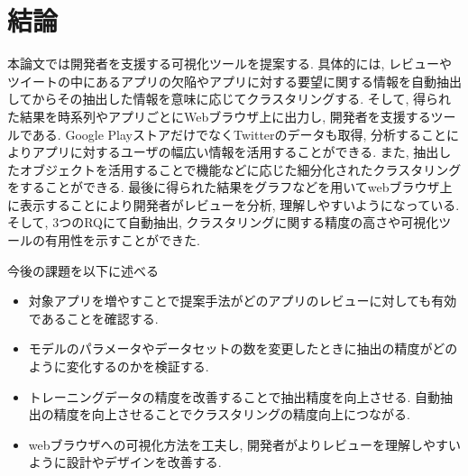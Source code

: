 \chapter{結論}
\label{chap:keturon}

本論文では開発者を支援する可視化ツールを提案する. 具体的には, レビューやツイートの中にあるアプリの欠陥やアプリに対する要望に関する情報を自動抽出してからその抽出した情報を意味に応じてクラスタリングする.  そして, 得られた結果を時系列やアプリごとにWebブラウザ上に出力し, 開発者を支援するツールである.
Google PlayストアだけでなくTwitterのデータも取得, 分析することによりアプリに対するユーザの幅広い情報を活用することができる. また, 抽出したオブジェクトを活用することで機能などに応じた細分化されたクラスタリングをすることができる. 最後に得られた結果をグラフなどを用いてwebブラウザ上に表示することにより開発者がレビューを分析, 理解しやすいようになっている. 
そして, 3つのRQにて自動抽出, クラスタリングに関する精度の高さや可視化ツールの有用性を示すことができた. 

今後の課題を以下に述べる

\begin{itemize}
    \item 対象アプリを増やすことで提案手法がどのアプリのレビューに対しても有効であることを確認する. 
    \item モデルのパラメータやデータセットの数を変更したときに抽出の精度がどのように変化するのかを検証する. 
    \item トレーニングデータの精度を改善することで抽出精度を向上させる. 自動抽出の精度を向上させることでクラスタリングの精度向上につながる. 
    \item webブラウザへの可視化方法を工夫し, 開発者がよりレビューを理解しやすいように設計やデザインを改善する. 
\end{itemize}
